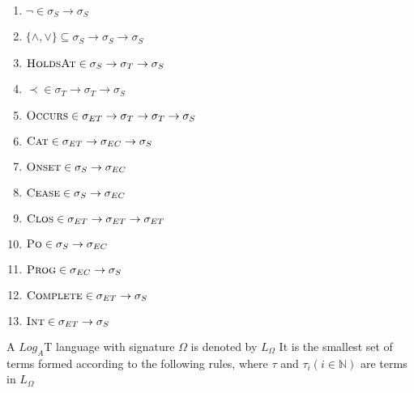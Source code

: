 \begin{enumerate}
	\item $\neg \in \sigma_S \to \sigma_S$
	\item $\{\land, \lor \} \subseteq \sigma_S \to \sigma_S \to \sigma_S$
	\item $\textsc{HoldsAt} \in \sigma_S \to \sigma_T \to \sigma_S$
	\item $\prec \in \sigma_T \to \sigma_T \to \sigma_S$
	\item $\textsc{Occurs} \in \sigma_{ET} \to \sigma_T \to \sigma_T \to \sigma_S$
	\item $\textsc{Cat} \in \sigma_{ET} \to \sigma_{EC} \to \sigma_S$
	\item $\textsc{Onset} \in \sigma_S \to \sigma_{EC}$
	\item $\textsc{Cease} \in \sigma_S \to \sigma_{EC}$
	\item $\textsc{Clos} \in \sigma_{ET} \to \sigma_{ET} \to \sigma_{ET}$
	\item $\textsc{Po} \in \sigma_S \to \sigma_{EC}$
	\item $\textsc{Prog} \in \sigma_{EC} \to \sigma_S$
	\item $\textsc{Complete} \in \sigma_{ET} \to \sigma_S$
	      \item$\textsc{Int} \in \sigma_{ET} \to \sigma_S$
\end{enumerate}

A $Log_A$T language with signature $\Omega$ is denoted by $L_{\Omega}$ It
is the smallest set of terms formed according to the following
rules, where $\tau$ and $\tau_i (i \in \mathbb{N})$ are terms in $L_{\Omega}$

